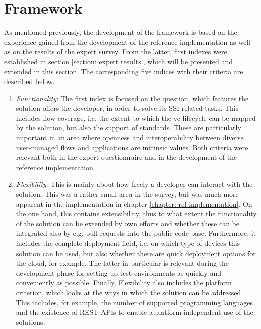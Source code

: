 	\section{Framework}
	
    As mentioned previously, the development of the framework is based on the experience gained from the development of the reference implementation as well as on the results of the expert survey. From the latter, first indexes were established in section \ref{section: expert results}, which will be presented and extended in this section. The corresponding five indices with their criteria are described below.
    
    \begin{enumerate}
        \item \textit{Functionality}: The first index is focused on the question, which features the solution offers the developer, in order to solve its \ac{SSI} related tasks. This includes flow coverage, i.e. the extent to which the \ac{vc} lifecycle can be mapped by the solution, but also the support of standards. These are particularly important in an area where openness and interoperability between diverse user-managed flows and applications are intrinsic values. Both criteria were relevant both in the expert questionnaire and in the development of the reference implementation.
        \item \textit{Flexibility}: This is mainly about how freely a developer can interact with the solution. This was a rather small area in the survey, but was much more apparent in the implementation in chapter \ref{chapter: ref implementation}. On the one hand, this contains extensibility, thus to what extent the functionality of the solution can be extended by own efforts and whether these can be integrated also by e.g. pull requests into the public code base. Furthermore, it includes the complete deployment field, i.e. on which type of devices this solution can be used, but also whether there are quick deployment options for the cloud, for example. The latter in particular is relevant during the development phase for setting up test environments as quickly and conveniently as possible. Finally, Flexibility also includes the platform criterion, which looks at the ways in which the solution can be addressed. This includes, for example, the number of supported programming languages and the existence of REST APIs to enable a platform-independent use of the solutions.

\end{enumerate}
